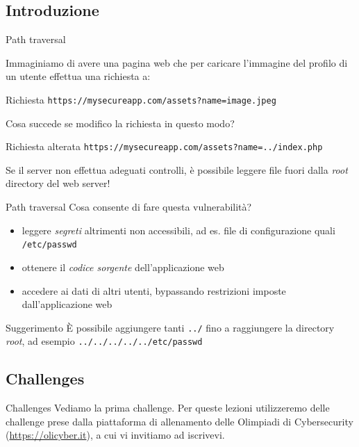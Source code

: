 \documentclass[12pt,handout]{beamer}
\begin{document}
\subsection{Introduzione}
\begin{frame}{Path traversal}

Immaginiamo di avere una pagina web che per caricare l'immagine del profilo di un utente effettua una richiesta a:

\begin{exampleblock}{Richiesta}
\texttt{https://mysecureapp.com/assets?name=image.jpeg}
\end{exampleblock}

\pause
\vfill
Cosa succede se modifico la richiesta in questo modo?

\begin{exampleblock}{Richiesta alterata}
\texttt{https://mysecureapp.com/assets?name=../index.php}
\end{exampleblock}
    
\pause

Se il server non effettua adeguati controlli, è possibile leggere file fuori dalla \textit{root} directory del web server!

\end{frame}
\begin{frame}{Path traversal}
Cosa consente di fare questa vulnerabilità?
\vfill
\pause
\begin{itemize}
    \item leggere \textit{segreti} altrimenti non accessibili, ad es. file di configurazione quali \texttt{/etc/passwd}
    \pause
    \item ottenere il \textit{codice sorgente} dell'applicazione web
    \pause
    \item accedere ai dati di altri utenti, bypassando restrizioni imposte dall'applicazione web
    \pause
\end{itemize}

\vfill
\begin{block}{Suggerimento}
È possibile aggiungere tanti \texttt{../} fino a raggiungere la directory \textit{root}, ad esempio \texttt{../../../../../etc/passwd}
\end{block}

\end{frame}
\subsection{Challenges}
\begin{frame}{Challenges}
Vediamo la prima challenge. Per queste lezioni utilizzeremo delle challenge 
prese dalla piattaforma di allenamento delle Olimpiadi di Cybersecurity (\url{https://olicyber.it}), 
a cui vi invitiamo ad iscrivevi.
\end{frame}
\end{document}
